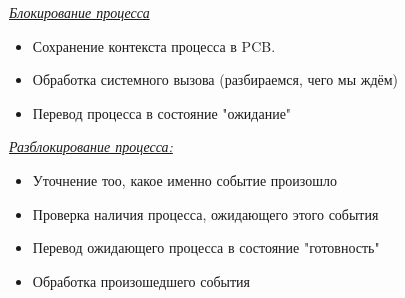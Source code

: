\documentclass[12pt, a4paper]{article}
\begin{document}
    \underline{\textit{Блокирование процесса}}
    \begin{itemize}
        \item Сохранение контекста процесса в PCB.
        \item Обработка системного вызова (разбираемся, чего мы ждём)
        \item Перевод процесса в состояние "ожидание"
    \end{itemize}
    \underline{\textit{Разблокирование процесса:}}
    \begin{itemize}
        \item Уточнение тоо, какое именно событие произошло
        \item Проверка наличия процесса, ожидающего этого события
        \item Перевод ожидающего процесса в состояние "готовность"
        \item Обработка произошедшего события
    \end{itemize}
\end{document}

